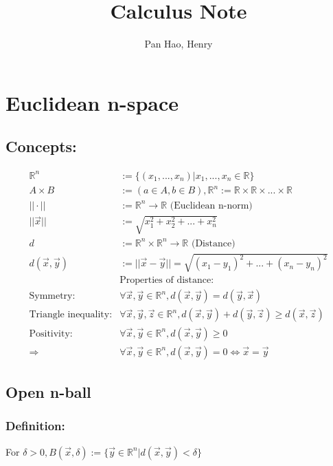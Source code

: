 \documentclass[11pt, a4paper]{article}
\begin{document}
\title{Calculus Note}
\author{Pan Hao, Henry}
\maketitle

    \section{Euclidean n-space}
        \subsection{Concepts:}
            $$\begin{aligned}
                \mathbb{R}^n &:= \{(x_1, ..., x_n)|x_1, ..., x_n \in \mathbb{R}\} \\
                A \times B &:= (a \in A, b \in B), \mathbb{R}^n := \mathbb{R} \times \mathbb{R} \times ... \times \mathbb{R} \\
                ||\cdot|| &:= \mathbb{R}^n \rightarrow \mathbb{R} \text{ (Euclidean n-norm)} \\
                ||\vec{x}|| &:= \sqrt{x_1^2 + x_2^2 + ... + x_n^2} \\
                d &:= \mathbb{R}^n \times \mathbb{R}^n \rightarrow \mathbb{R} \text{ (Distance)} \\
                d(\vec{x}, \vec{y}) &:= ||\vec{x} - \vec{y}|| = \sqrt{(x_1 - y_1)^2 + ... + (x_n - y_n)^2} \\
                &\text{Properties of distance:} \\
                \text{Symmetry:}& \forall \vec{x}, \vec{y} \in \mathbb{R}^n, d(\vec{x}, \vec{y}) = d(\vec{y}, \vec{x}) \\
                \text{Triangle inequality:}& \forall \vec{x}, \vec{y}, \vec{z} \in \mathbb{R}^n, d(\vec{x}, \vec{y}) + d(\vec{y}, \vec{z}) \geq d(\vec{x}, \vec{z}) \\
                \text{Positivity:}& \forall \vec{x}, \vec{y} \in \mathbb{R}^n, d(\vec{x}, \vec{y}) \geq 0 \\
                \Rightarrow& \forall \vec{x}, \vec{y} \in \mathbb{R}^n, d(\vec{x}, \vec{y}) = 0 \Leftrightarrow \vec{x} = \vec{y}
            \end{aligned}$$
        \subsection{Open n-ball}
            \subsubsection{Definition:} For $\delta > 0, B(\vec{x}, \delta) := \{\vec{y} \in \mathbb{R}^n | d(\vec{x}, \vec{y}) < \delta\}$
\end{document}

